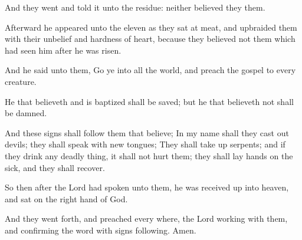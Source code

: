 \verse And they went and told it unto the residue: neither believed they them.

\verse Afterward he appeared unto the eleven as they sat at meat, and upbraided them with their unbelief and hardness of heart, because they believed not them which had seen him after he was risen.

\verse And he said unto them, Go ye into all the world, and preach the gospel to every creature.

\verse He that believeth and is baptized shall be saved; but he that believeth not shall be damned.

\verse And these signs shall follow them that believe; In my name shall they cast out devils; they shall speak with new tongues; \verse They shall take up serpents; and if they drink any deadly thing, it shall not hurt them; they shall lay hands on the sick, and they shall recover.

\verse So then after the Lord had spoken unto them, he was received up into heaven, and sat on the right hand of God.

\verse And they went forth, and preached every where, the Lord working with them, and confirming the word with signs following. Amen.

